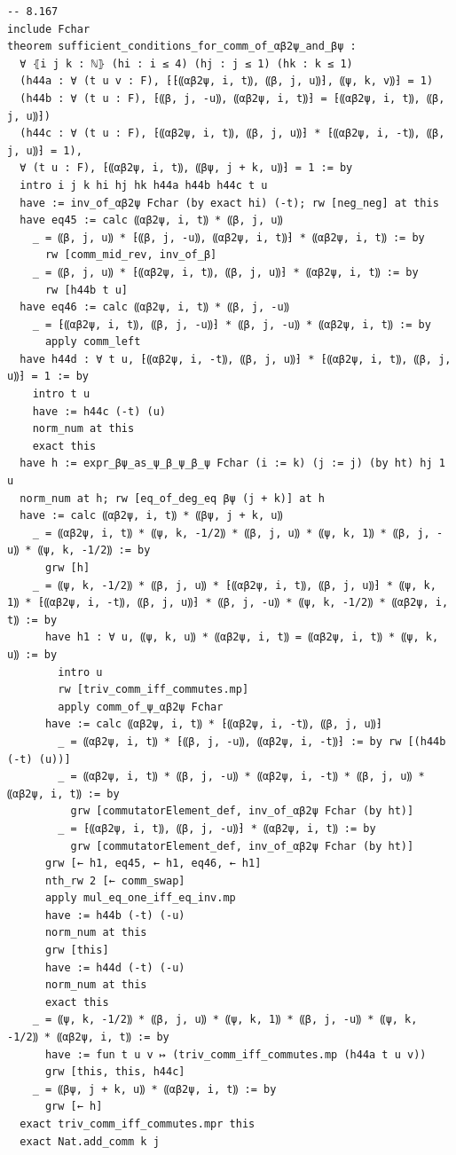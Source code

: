 \documentclass[10pt,a4paper]{article}
\begin{document}
\begin{Verbatim}
-- 8.167
include Fchar
theorem sufficient_conditions_for_comm_of_αβ2ψ_and_βψ :
  ∀ ⦃i j k : ℕ⦄ (hi : i ≤ 4) (hj : j ≤ 1) (hk : k ≤ 1)
  (h44a : ∀ (t u v : F), ⁅⁅⸨αβ2ψ, i, t⸩, ⸨β, j, u⸩⁆, ⸨ψ, k, v⸩⁆ = 1)
  (h44b : ∀ (t u : F), ⁅⸨β, j, -u⸩, ⸨αβ2ψ, i, t⸩⁆ = ⁅⸨αβ2ψ, i, t⸩, ⸨β, j, u⸩⁆)
  (h44c : ∀ (t u : F), ⁅⸨αβ2ψ, i, t⸩, ⸨β, j, u⸩⁆ * ⁅⸨αβ2ψ, i, -t⸩, ⸨β, j, u⸩⁆ = 1),
  ∀ (t u : F), ⁅⸨αβ2ψ, i, t⸩, ⸨βψ, j + k, u⸩⁆ = 1 := by
  intro i j k hi hj hk h44a h44b h44c t u
  have := inv_of_αβ2ψ Fchar (by exact hi) (-t); rw [neg_neg] at this
  have eq45 := calc ⸨αβ2ψ, i, t⸩ * ⸨β, j, u⸩
    _ = ⸨β, j, u⸩ * ⁅⸨β, j, -u⸩, ⸨αβ2ψ, i, t⸩⁆ * ⸨αβ2ψ, i, t⸩ := by
      rw [comm_mid_rev, inv_of_β]
    _ = ⸨β, j, u⸩ * ⁅⸨αβ2ψ, i, t⸩, ⸨β, j, u⸩⁆ * ⸨αβ2ψ, i, t⸩ := by
      rw [h44b t u]
  have eq46 := calc ⸨αβ2ψ, i, t⸩ * ⸨β, j, -u⸩
    _ = ⁅⸨αβ2ψ, i, t⸩, ⸨β, j, -u⸩⁆ * ⸨β, j, -u⸩ * ⸨αβ2ψ, i, t⸩ := by
      apply comm_left
  have h44d : ∀ t u, ⁅⸨αβ2ψ, i, -t⸩, ⸨β, j, u⸩⁆ * ⁅⸨αβ2ψ, i, t⸩, ⸨β, j, u⸩⁆ = 1 := by
    intro t u
    have := h44c (-t) (u)
    norm_num at this
    exact this
  have h := expr_βψ_as_ψ_β_ψ_β_ψ Fchar (i := k) (j := j) (by ht) hj 1 u
  norm_num at h; rw [eq_of_deg_eq βψ (j + k)] at h
  have := calc ⸨αβ2ψ, i, t⸩ * ⸨βψ, j + k, u⸩
    _ = ⸨αβ2ψ, i, t⸩ * ⸨ψ, k, -1/2⸩ * ⸨β, j, u⸩ * ⸨ψ, k, 1⸩ * ⸨β, j, -u⸩ * ⸨ψ, k, -1/2⸩ := by
      grw [h]
    _ = ⸨ψ, k, -1/2⸩ * ⸨β, j, u⸩ * ⁅⸨αβ2ψ, i, t⸩, ⸨β, j, u⸩⁆ * ⸨ψ, k, 1⸩ * ⁅⸨αβ2ψ, i, -t⸩, ⸨β, j, u⸩⁆ * ⸨β, j, -u⸩ * ⸨ψ, k, -1/2⸩ * ⸨αβ2ψ, i, t⸩ := by
      have h1 : ∀ u, ⸨ψ, k, u⸩ * ⸨αβ2ψ, i, t⸩ = ⸨αβ2ψ, i, t⸩ * ⸨ψ, k, u⸩ := by
        intro u
        rw [triv_comm_iff_commutes.mp]
        apply comm_of_ψ_αβ2ψ Fchar
      have := calc ⸨αβ2ψ, i, t⸩ * ⁅⸨αβ2ψ, i, -t⸩, ⸨β, j, u⸩⁆
        _ = ⸨αβ2ψ, i, t⸩ * ⁅⸨β, j, -u⸩, ⸨αβ2ψ, i, -t⸩⁆ := by rw [(h44b (-t) (u))]
        _ = ⸨αβ2ψ, i, t⸩ * ⸨β, j, -u⸩ * ⸨αβ2ψ, i, -t⸩ * ⸨β, j, u⸩ * ⸨αβ2ψ, i, t⸩ := by
          grw [commutatorElement_def, inv_of_αβ2ψ Fchar (by ht)]
        _ = ⁅⸨αβ2ψ, i, t⸩, ⸨β, j, -u⸩⁆ * ⸨αβ2ψ, i, t⸩ := by
          grw [commutatorElement_def, inv_of_αβ2ψ Fchar (by ht)]
      grw [← h1, eq45, ← h1, eq46, ← h1]
      nth_rw 2 [← comm_swap]
      apply mul_eq_one_iff_eq_inv.mp
      have := h44b (-t) (-u)
      norm_num at this
      grw [this]
      have := h44d (-t) (-u)
      norm_num at this
      exact this
    _ = ⸨ψ, k, -1/2⸩ * ⸨β, j, u⸩ * ⸨ψ, k, 1⸩ * ⸨β, j, -u⸩ * ⸨ψ, k, -1/2⸩ * ⸨αβ2ψ, i, t⸩ := by
      have := fun t u v ↦ (triv_comm_iff_commutes.mp (h44a t u v))
      grw [this, this, h44c]
    _ = ⸨βψ, j + k, u⸩ * ⸨αβ2ψ, i, t⸩ := by
      grw [← h]
  exact triv_comm_iff_commutes.mpr this
  exact Nat.add_comm k j


\end{Verbatim}
\end{document}
